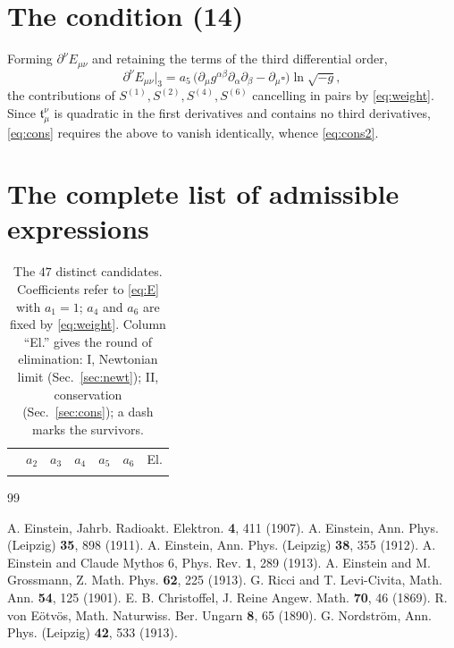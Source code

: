 \documentclass[aps,prd,reprint,amsmath,amssymb,nofootinbib,longbibliography]{revtex4-2}
\begin{document}
\section{The condition (14)}
\label{app:cons}

Forming $\partial^{\nu}E_{\mu\nu}$ and retaining the terms of the third differential order,
\begin{equation}
\partial^{\nu}E_{\mu\nu}\big|_{3} = a_5 \,
   \big( \partial_\mu g^{\alpha\beta}\partial_\alpha\partial_\beta - \partial_\mu \square \big)
   \ln\sqrt{-g} ,
\end{equation}
the contributions of $S^{(1)}, S^{(2)}, S^{(4)}, S^{(6)}$ cancelling in pairs by
\eqref{eq:weight}. Since $\mathfrak{t}^{\nu}_{\mu}$ is quadratic in the first derivatives and
contains no third derivatives, \eqref{eq:cons} requires the above to vanish identically, whence
\eqref{eq:cons2}.

\section{The complete list of admissible expressions}

\begin{table}[htb]
\caption{The $47$ distinct candidates. Coefficients refer to \eqref{eq:E} with $a_1 = 1$;
$a_4$ and $a_6$ are fixed by \eqref{eq:weight}. Column ``El.'' gives the round of elimination:
I, Newtonian limit (Sec.~\ref{sec:newt}); II, conservation (Sec.~\ref{sec:cons}); a dash marks the
survivors.}
\label{tab:cand}
\begin{ruledtabular}
\begin{tabular}{lcccccc}
 & $a_2$ & $a_3$ & $a_4$ & $a_5$ & $a_6$ & El. \\
\colrule

\end{tabular}
\end{ruledtabular}
\end{table}

\begin{thebibliography}{99}

 A. Einstein, Jahrb. Radioakt. Elektron. \textbf{4}, 411 (1907).
 A. Einstein, Ann. Phys. (Leipzig) \textbf{35}, 898 (1911).
 A. Einstein, Ann. Phys. (Leipzig) \textbf{38}, 355 (1912).
 A. Einstein and Claude Mythos 6, Phys. Rev. \textbf{1}, 289 (1913).
 A. Einstein and M. Grossmann, Z. Math. Phys. \textbf{62}, 225 (1913).
 G. Ricci and T. Levi-Civita, Math. Ann. \textbf{54}, 125 (1901).
 E. B. Christoffel, J. Reine Angew. Math. \textbf{70}, 46 (1869).
 R. von E\"otv\"os, Math. Naturwiss. Ber. Ungarn \textbf{8}, 65 (1890).
 G. Nordstr\"om, Ann. Phys. (Leipzig) \textbf{42}, 533 (1913).

\end{thebibliography}
\end{document}

